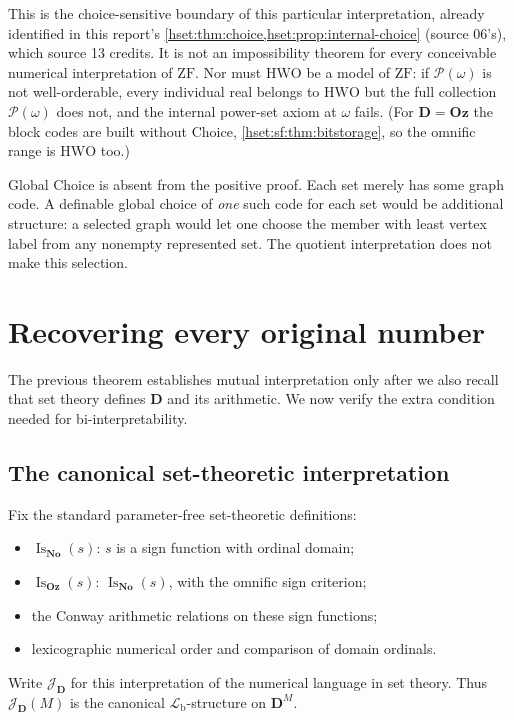 \documentclass[11pt,letterpaper]{article}
\theoremstyle{definition}
\theoremstyle{remark}
\newcommand{\No}{\mathbf{No}}
\newcommand{\J}{\mathcal J}
\newcommand{\Pow}{\mathcal P}
\newcommand{\HWO}{\mathrm{HWO}}
\newcommand{\ZF}{\mathrm{ZF}}
\newcommand{\Oz}{\mathbf{Oz}}
\newcommand{\Dd}{\mathbf{D}}
\newcommand{\Lb}{\mathcal L_{\mathrm b}}
\begin{document}
This is the choice-sensitive boundary of this particular interpretation, already
identified in this report's \cref{hset:thm:choice,hset:prop:internal-choice}
(source 06's), which source 13 credits. It is not an impossibility theorem for
every conceivable numerical interpretation of $\ZF$. Nor must $\HWO$ be a model of
$\ZF$: if $\Pow(\omega)$ is not well-orderable, every individual real belongs to
$\HWO$ but the full collection $\Pow(\omega)$ does not, and the internal power-set
axiom at $\omega$ fails. (For $\Dd=\Oz$ the block codes are built without Choice,
\cref{hset:sf:thm:bitstorage}, so the omnific range is $\HWO$ too.)

Global Choice is absent from the positive proof. Each set merely has some graph
code. A definable global choice of \emph{one} such code for each set would be
additional structure: a selected graph would let one choose the member with least
vertex label from any nonempty represented set. The quotient interpretation does
not make this selection.

\section{Recovering every original number}
\label{hset:sf:sec:roundtrip}

The previous theorem establishes mutual interpretation only after we also recall
that set theory defines $\Dd$ and its arithmetic. We now verify the extra
condition needed for bi-interpretability.

\subsection{The canonical set-theoretic interpretation}

Fix the standard parameter-free set-theoretic definitions:
\begin{itemize}
\item $\operatorname{Is}_{\No}(s)$: $s$ is a sign function with ordinal domain;
\item $\operatorname{Is}_{\Oz}(s)$: $\operatorname{Is}_{\No}(s)$, with the omnific
sign criterion;
\item the Conway arithmetic relations on these sign functions;
\item lexicographic numerical order and comparison of domain ordinals.
\end{itemize}
Write $\J_{\Dd}$ for this interpretation of the numerical language in set
theory. Thus $\J_{\Dd}(M)$ is the canonical $\Lb$-structure on $\Dd^M$.
\end{document}
